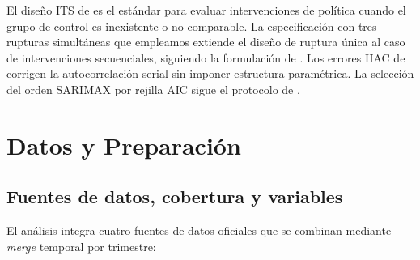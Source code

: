 \documentclass[10pt,a4paper,twocolumn]{article}
\begin{document}
El diseño ITS de \citet{wagner2002its} es el estándar para evaluar intervenciones
de política cuando el grupo de control es inexistente o no comparable.
La especificación con tres rupturas simultáneas que empleamos extiende el diseño
de ruptura única al caso de intervenciones secuenciales, siguiendo la formulación
de \citet{cruz2019its}. Los errores HAC de \citet{newey1987hac} corrigen la
autocorrelación serial sin imponer estructura paramétrica. La selección del orden
SARIMAX por rejilla AIC sigue el protocolo de \citet{hyndman2021forecasting}.

\section{Datos y Preparación}
\label{sec:datos}

\subsection{Fuentes de datos, cobertura y variables}

El análisis integra cuatro fuentes de datos oficiales \citep{incasol2025,ine2025ipc,bde2025euribor,idescat2025ist}
que se combinan mediante \textit{merge} temporal por trimestre:
\end{document}
